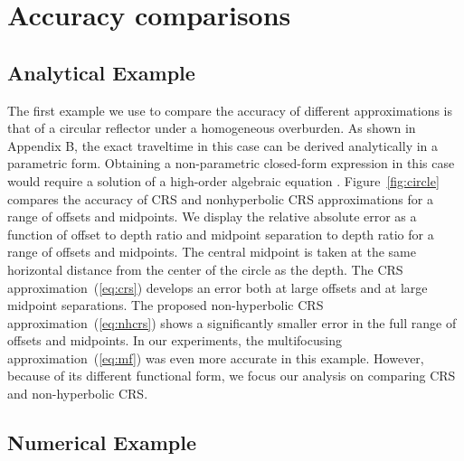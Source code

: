 \section{Accuracy comparisons}

\subsection{Analytical Example}


The first example we use to compare the accuracy of different
approximations is that of a circular reflector under a homogeneous
overburden. As shown in Appendix B, the exact traveltime in this case
can be derived analytically in a parametric form. Obtaining a
non-parametric closed-form expression in this case would require a
solution of a high-order algebraic equation \cite[]{sigma}.
Figure~\ref{fig:circle} compares the accuracy of CRS and nonhyperbolic
CRS approximations for a range of offsets and midpoints. We display
the relative absolute error as a function of offset to depth ratio and
midpoint separation to depth ratio for a range of offsets and
midpoints. The central midpoint is taken at the same horizontal
distance from the center of the circle as the depth.  The CRS
approximation~(\ref{eq:crs}) develops an error both at large offsets
and at large midpoint separations. The proposed non-hyperbolic CRS
approximation~(\ref{eq:nhcrs}) shows a significantly smaller error in
the full range of offsets and midpoints. In our experiments, the
multifocusing approximation~(\ref{eq:mf}) was even more accurate in
this example. However, because of its different functional form, we
focus our analysis on comparing CRS and non-hyperbolic CRS.

\subsection{Numerical Example}

\newcommand{\parvec}[1]{\textbf{#1}}


